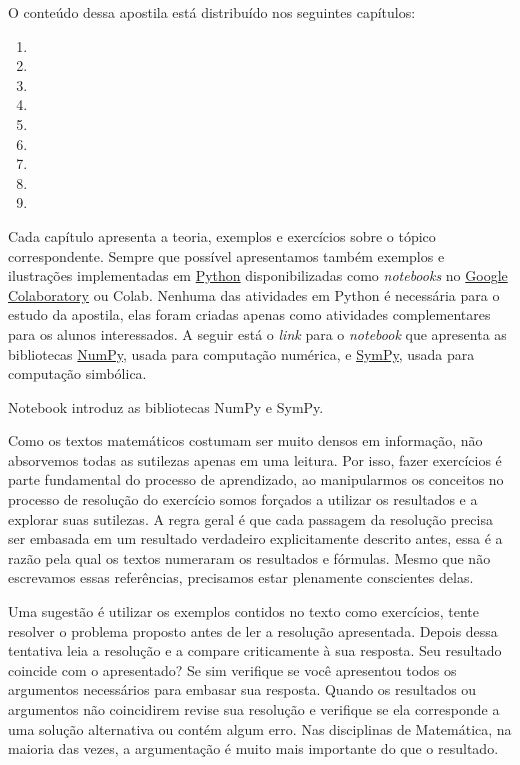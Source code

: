 O conteúdo dessa apostila está distribuído nos seguintes capítulos:
\vspace{-0.5\baselineskip}
\begin{enumerate}[nosep]
  \item {}
  \item {}
  \item {}
  \item {}
  \item {}
  \item {}
  \item {}
  \item {}
  \item {}
\end{enumerate}
Cada capítulo apresenta a teoria, exemplos e exercícios sobre o tópico correspondente.
Sempre que possível apresentamos também exemplos e ilustrações implementadas em
\href{https://www.python.org}{Python} disponibilizadas como
\textit{notebooks} no
\href{https://colab.research.google.com}{Google Colaboratory} ou Colab.
Nenhuma das atividades em Python é necessária para o estudo da apostila,
elas foram criadas apenas como atividades complementares para os alunos interessados.
A seguir está o \textit{link} para o \textit{notebook} que apresenta as bibliotecas
\href{https://numpy.org}{NumPy}, usada para computação numérica, e
\href{https://www.sympy.org}{SymPy}, usada para computação simbólica.

{
  Notebook introduz as bibliotecas NumPy e SymPy.
}

Como os textos matemáticos costumam ser muito densos em informação,
não absorvemos todas as sutilezas apenas em uma leitura. Por isso, fazer exercícios é
parte fundamental do processo de aprendizado, ao manipularmos os conceitos no processo
de resolução do exercício somos forçados a utilizar os resultados e a explorar suas
sutilezas. A regra geral é que cada passagem da resolução precisa ser embasada em um
resultado verdadeiro explicitamente descrito antes, essa é a razão pela qual os textos
numeraram os resultados e fórmulas. Mesmo que não escrevamos essas referências,
precisamos estar plenamente conscientes delas.

Uma sugestão é utilizar os exemplos contidos no texto como exercícios, tente resolver
o problema proposto antes de ler a resolução apresentada. Depois dessa tentativa leia
a resolução e a compare criticamente à sua resposta.
Seu resultado coincide com o apresentado? Se sim verifique se você apresentou todos os
argumentos necessários para embasar sua resposta.
Quando os resultados ou argumentos não coincidirem revise
sua resolução e verifique se ela corresponde a uma solução alternativa ou contém
algum erro. Nas disciplinas de Matemática, na maioria das vezes, a argumentação
é muito mais importante do que o resultado.

